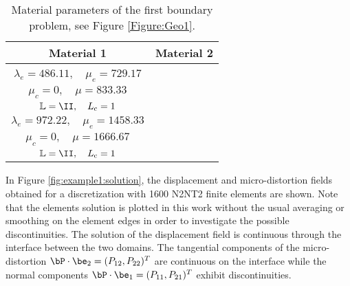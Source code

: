 \begin{table}[ht]
\center
\begin{tabular}{|c|c|}
\hline
Material 1 & Material 2 \\
\hline
\begin{minipage}[t]{7cm}
	$ \lambda_\textrm{micro} = 555.55 , \quad \mu_\textrm{micro} = 833.33$ \\ $\lambda_e = 486.11, \quad \mu_e = 729.17$\\
	$\mu_c = 0, \quad \mu=833.33$ \\ 
	$\IL = \II, \quad \Lc=1$ 
\end{minipage} & 
\begin{minipage}[t]{7cm}
	$ \lambda_\textrm{micro} = 1111.11 , \quad \mu_\textrm{micro} = 1667.67$ \\ $\lambda_e = 972.22, \quad \mu_e = 1458.33$\\
	$\mu_c = 0, \quad \mu=1666.67$ \\
	 $\IL = \II, \quad \Lc=1$ 
\end{minipage} \\
\hline
\end{tabular}
\caption{Material parameters of the first boundary problem, see Figure \ref{Figure:Geo1}.}
\label{tab:example1:MP}
\end{table}
In Figure \ref{fig:example1:solution}, the displacement and micro-distortion fields obtained for a discretization with 1600 N2NT2 finite elements are shown.  Note that the elements solution is plotted in this work without the usual averaging or smoothing on the element edges in order to investigate the possible discontinuities. The solution of the displacement field is continuous through the interface  between the two domains. The tangential components of the micro-distortion $\Bdis \cdot \be_2 = (\dis_{12},\dis_{22})^T$ are continuous on the interface while the normal components $\Bdis \cdot \be_1 = (\dis_{11},\dis_{21})^T$ exhibit discontinuities. 

